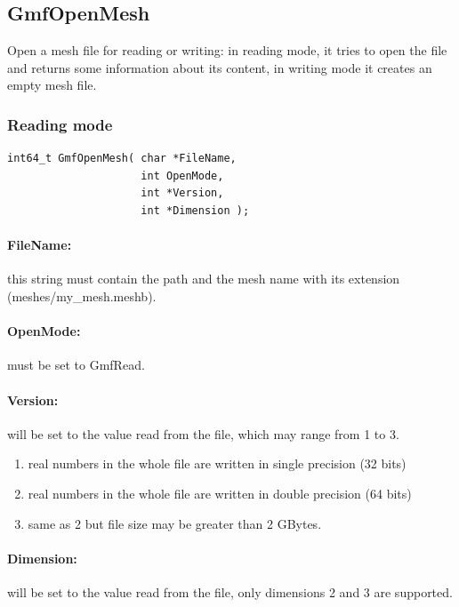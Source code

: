 \documentclass[a4paper,12pt]{article}
\begin{document}
\subsection{GmfOpenMesh}
Open a mesh file for reading or writing: in reading mode, it tries to open the file and returns some information about its content, in writing mode it creates an empty mesh file.

\subsubsection{Reading mode}
\begin{tt}
\begin{verbatim}
int64_t GmfOpenMesh( char *FileName,
                     int OpenMode,
                     int *Version,
                     int *Dimension );
\end{verbatim}
\end{tt}
\normalfont

\paragraph{FileName:}
this string must contain the path and the mesh name with its extension (meshes/my\_mesh.meshb).

\paragraph{OpenMode:}
must be set to GmfRead.

\paragraph{Version:}
will be set to the value read from the file, which may range from 1 to 3.

\begin{enumerate}
	\item real numbers in the whole file are written in single precision (32 bits)
	\item real numbers in the whole file are written in double precision (64 bits)
	\item same as 2 but file size may be greater than 2 GBytes.
\end{enumerate}

\paragraph{Dimension:}
will be set to the value read from the file, only dimensions 2 and 3 are supported.
\end{document}

